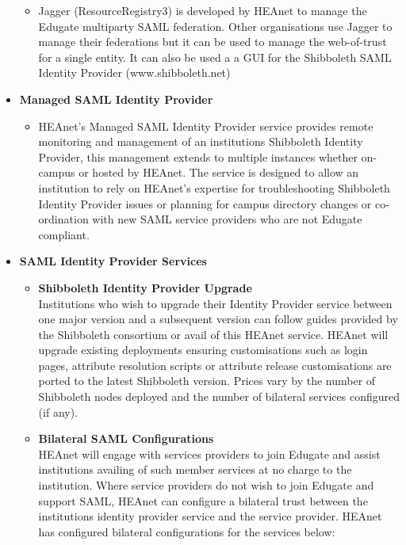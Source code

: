 \documentclass{article}
\begin{document}
\begin{itemize}
\begin{itemize}
	      	\item 	Jagger (ResourceRegistry3) is developed by HEAnet to manage the Edugate multiparty SAML federation. Other organisations use Jagger to manage their federations but it can be used to manage the web-of-trust for a single entity. It can also be used a a GUI for the Shibboleth SAML Identity Provider (www.shibboleth.net) 
	      \end{itemize}
	\item \textbf{Managed SAML Identity Provider}
	      \begin{itemize}
	      	\item HEAnet's Managed SAML Identity Provider service provides remote monitoring and management of an institutions Shibboleth Identity Provider, this management extends to multiple instances whether on-campus or hosted by HEAnet. The service is designed to allow an institution to rely on HEAnet's expertise for troubleshooting Shibboleth Identity Provider issues or planning for campus directory changes or co-ordination with new SAML service providers who are not Edugate compliant.	
	      \end{itemize}
	      \newpage
	\item \textbf{SAML Identity Provider Services}
	      \begin{itemize}
	      	\item \textbf{Shibboleth Identity Provider Upgrade}\\
	      	      Institutions who wish to upgrade their Identity Provider service between one major version and a subsequent version can follow guides provided by the Shibboleth consortium or avail of this HEAnet service. HEAnet will upgrade existing deployments ensuring customisations such as login pages, attribute resolution scripts or attribute release customisations are ported to the latest Shibboleth version. Prices vary by the number of Shibboleth nodes deployed and the number of bilateral services configured (if any).
	      	\item \textbf{Bilateral SAML Configurations}\\
	      	      HEAnet will engage with services providers to join Edugate and assist institutions availing of such member services at no charge to the institution. Where service providers do not wish to join Edugate and support SAML, HEAnet can configure a bilateral trust between the institutions identity provider service and the service provider. HEAnet has configured bilateral configurations for the services below:
	      	      \begin{itemize}

\end{itemize}
\end{itemize}
\end{itemize}
\end{document}

